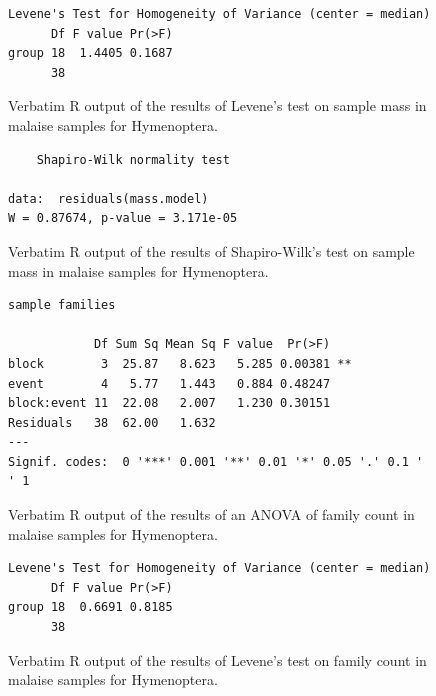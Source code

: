 \documentclass[10pt,letterpaper,twocolumn]{article}
\begin{document}
\begin{figure}[h]
	\lstset{numbers=left}
	\lstset{xleftmargin=5mm,framexleftmargin=5mm}
	\begin{lstlisting}
Levene's Test for Homogeneity of Variance (center = median)
      Df F value Pr(>F)
group 18  1.4405 0.1687
      38               
	\end{lstlisting}
	\caption{Verbatim R output of the results of Levene's test on sample mass in malaise samples for Hymenoptera.}
	\label{fig:malaise_hymenoptera_mass_levene}
	\smallskip
	\nointerlineskip
	\hrulefill
\end{figure}

\begin{figure}[h]
	\lstset{numbers=left}
	\lstset{xleftmargin=5mm,framexleftmargin=5mm}
	\begin{lstlisting}
	Shapiro-Wilk normality test

data:  residuals(mass.model)
W = 0.87674, p-value = 3.171e-05
	\end{lstlisting}
	\caption{Verbatim R output of the results of Shapiro-Wilk's test on sample mass in malaise samples for Hymenoptera.}
	\label{fig:malaise_hymenoptera_mass_shapiro}
	\smallskip
	\nointerlineskip
	\hrulefill
\end{figure}

\begin{figure}[h]
	\lstset{numbers=left}
	\lstset{xleftmargin=5mm,framexleftmargin=5mm}
	\begin{lstlisting}
sample families 

            Df Sum Sq Mean Sq F value  Pr(>F)   
block        3  25.87   8.623   5.285 0.00381 **
event        4   5.77   1.443   0.884 0.48247   
block:event 11  22.08   2.007   1.230 0.30151   
Residuals   38  62.00   1.632                   
---
Signif. codes:  0 '***' 0.001 '**' 0.01 '*' 0.05 '.' 0.1 ' ' 1
	\end{lstlisting}
	\caption{Verbatim R output of the results of an ANOVA of family count in malaise samples for Hymenoptera.}
	\label{fig:malaise_hymenoptera_family_anova}
	\smallskip
	\nointerlineskip
	\hrulefill
\end{figure}

\begin{figure}[h]
	\lstset{numbers=left}
	\lstset{xleftmargin=5mm,framexleftmargin=5mm}
	\begin{lstlisting}
Levene's Test for Homogeneity of Variance (center = median)
      Df F value Pr(>F)
group 18  0.6691 0.8185
      38               
	\end{lstlisting}
	\caption{Verbatim R output of the results of Levene's test on family count in malaise samples for Hymenoptera.}
	\label{fig:malaise_hymenoptera_family_levene}
	\smallskip
	\nointerlineskip
	\hrulefill
\end{figure}
\end{document}
